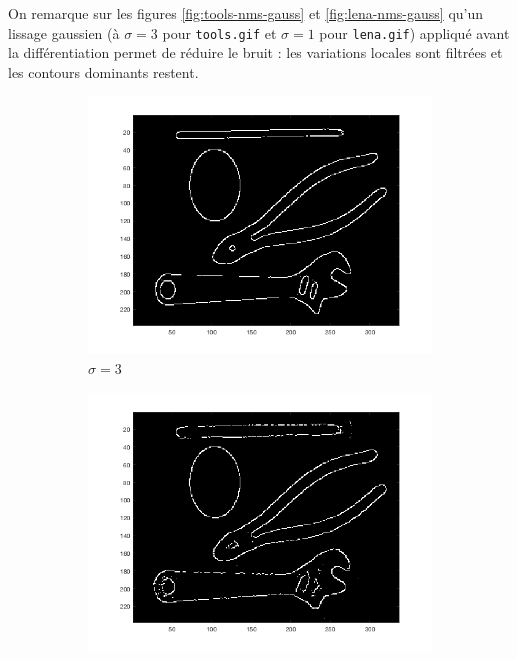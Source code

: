 \documentclass[a4paper]{article}
\begin{document}
On remarque sur les figures \ref{fig:tools-nms-gauss} et
\ref{fig:lena-nms-gauss} qu'un lissage gaussien (à $\sigma=3$ pour
\texttt{tools.gif} et $\sigma=1$ pour \texttt{lena.gif}) appliqué avant la
différentiation permet de réduire le bruit : les variations locales sont
filtrées et les contours dominants restent.

\begin{figure}[H]
    \centering
    \begin{subfigure}[c]{0.3\textwidth}
        \centering
        \includegraphics[width=\textwidth]{images/tools_nms_gauss.png}
        \caption{$\sigma=3$}
    \end{subfigure}
    \begin{subfigure}[c]{0.3\textwidth}
        \centering
        \includegraphics[width=\textwidth]{images/tools_nms_gauss5.png}

\end{subfigure}
\end{figure}
\end{document}
